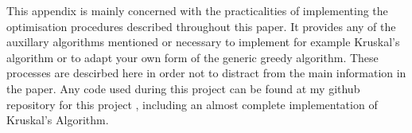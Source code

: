 \documentclass[../main.tex]{subfiles}
\begin{document}
This appendix is mainly concerned with the practicalities of implementing the optimisation procedures described throughout this paper. It provides any of the auxillary algorithms mentioned or necessary to implement for example Kruskal's algorithm or to adapt your own form of the generic greedy algorithm. These processes are descirbed here in order not to distract from the main information in the paper.  Any code used during this project can be found at my github repository for this project \cite{github}, including an almost complete implementation of Kruskal's Algorithm.
\end{document}
